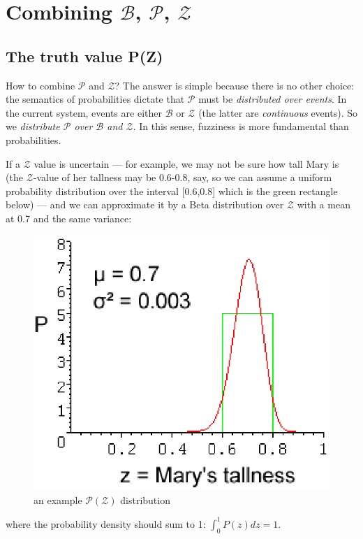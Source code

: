 \section{Combining $\mathcal{B}$, $\mathcal{P}$, $\mathcal{Z}$}
\label{sec:combinePZ}

\subsection{The truth value P(Z)}
\label{sec:P(Z)-defined}

How to combine $\mathcal{P}$ and $\mathcal{Z}$?  The answer is simple because there is no other choice:  the semantics of probabilities dictate that $\mathcal{P}$ must be \textit{distributed over events}.  In the current system, events are either $\mathcal{B}$ or $\mathcal{Z}$ (the latter are \textit{continuous} events).  So we \emph{distribute $\mathcal{P}$ over $\mathcal{B}$ and $\mathcal{Z}$}.  In this sense, fuzziness is more fundamental than probabilities.

If a $\mathcal{Z}$ value is uncertain --- for example, we may not be sure how tall Mary is (the $\mathcal{Z}$-value of her tallness may be 0.6-0.8, say, so we can assume a uniform probability distribution over the interval [0.6,0.8] which is the green rectangle below) --- and we can approximate it by a Beta distribution over $\mathcal{Z}$ with a mean at 0.7 and the same variance:
\begin{figure}[H]
\centering
\includegraphics[scale=0.9]{P-over-Z-Marys-Tallness2.eps}
\caption{an example $\mathcal{P}(\mathcal{Z})$ distribution}
\end{figure}
where the probability density should sum to 1: $ \int^1_0 P(z) dz = 1 $.

